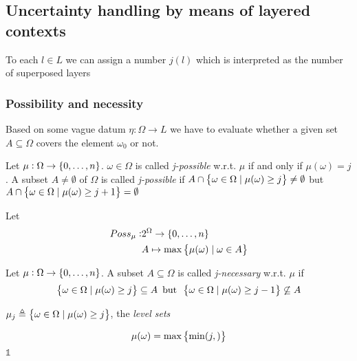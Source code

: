 \documentclass[11pt]{article}
\begin{document}
\subsection{Uncertainty handling by means of layered contexts}
\label{sec:org6b0eaa9}
To each \(l\in L\) we can assign a number \(j(l)\) which is interpreted as the
number of superposed layers
\subsubsection{Possibility and necessity}
\label{sec:orgad3e2f4}
Based on some vague datum \(\eta:\Omega\to L\) we have to evaluate whether a
given set \(A\subseteq\Omega\) covers the element \(\omega_0\) or not.
\begin{definition}[]
Let \(\mu:\Omega\to\left\{ 0,\dots,n\right\}\). \(\omega\in\Omega\) is called \emph{j-possible}
w.r.t. \(\mu\) if and only if \(\mu(\omega)=j\). A subset \(A\neq \emptyset\) of
\(\Omega\) is called \emph{j-possible} if
\(A\cap\left\{\omega\in\Omega\mid\mu(\omega)\ge j\right\}\neq\emptyset\)  but 
\(A\cap\left\{\omega\in\Omega\mid\mu(\omega)\ge j+1\right\}=\emptyset\)
\end{definition}

Let
\begin{align*}
Poss_\mu:&2^\Omega\to\left\{ 0,\dots,n\right\}\\
&A\mapsto \max\left\{\mu(\omega)\mid\omega\in A\right\}
\end{align*}
\begin{definition}[]
Let \(\mu:\Omega\to\left\{ 0,\dots,n\right\}\). A subset \(A\subseteq\Omega\) is called
\emph{j-necessary} w.r.t. \(\mu\) if 
\begin{equation*}
\left\{\omega\in\Omega\mid\mu(\omega)\ge j\right\}\subseteq A\enspace\text{but}\enspace
\left\{\omega\in\Omega\mid\mu(\omega)\ge j-1\right\}\not\subseteq A
\end{equation*}
\end{definition}
\(\mu_j\triangleq\left\{\omega\in\Omega\mid\mu(\omega)\ge j\right\}\), the \emph{level sets}

\begin{equation*}
\mu(\omega)=\max\left\{\min(j,)\right\}
\end{equation*}
\(\mathds{1}\)
\end{document}
